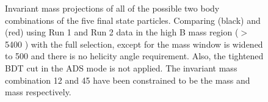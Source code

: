 \begin{figure}
\hfill
{}
\caption{Invariant mass projections of all of the possible two body combinations of the five final state particles. Comparing \decay{\Dz}{\Km\pip} (black) and \decay{\Dz}{\Kp\pim} (red) using Run 1 and Run 2 data in the high B mass region ($>$ 5400 \mevcc) with the full selection, except for the \Kstar mass window is widened to 500 \mev and there is no \KS helicity angle requirement. Also, the tightened BDT cut in the ADS mode is not applied. The invariant mass combination 12 and 45 have been constrained to be the \Dz mass and \KS mass respectively.}
\label{projections2bodydtf}
\end{figure}

